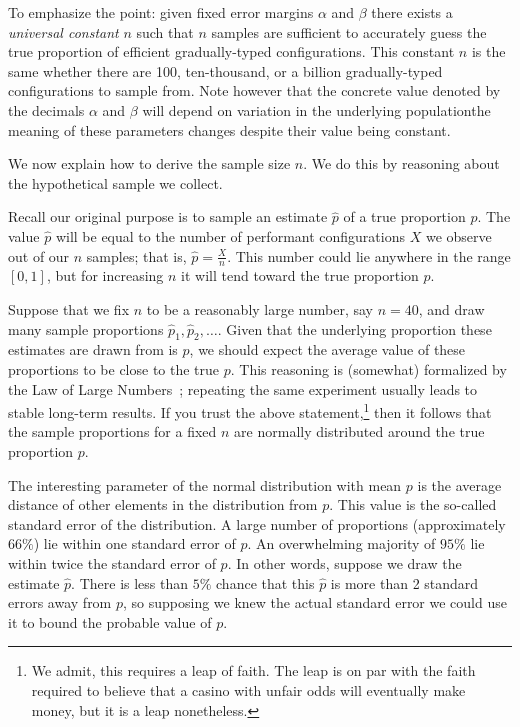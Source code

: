 \documentclass{article}
\begin{document}
To emphasize the point: given fixed error margins $\alpha$ and $\beta$ there exists a \emph{universal constant} $n$ such that $n$ samples are sufficient to accurately guess the true proportion of efficient gradually-typed configurations.
This constant $n$ is the same whether there are 100, ten-thousand, or a billion gradually-typed configurations to sample from.
Note however that the concrete value denoted by the decimals $\alpha$ and $\beta$ will depend on variation in the underlying population\textemdash the meaning of these parameters changes despite their value being constant.

We now explain how to derive the sample size $n$.
We do this by reasoning about the hypothetical sample we collect.

Recall our original purpose is to sample an estimate $\hat{p}$ of a true proportion $p$.
The value $\hat{p}$ will be equal to the number of performant configurations $X$ we observe out of our $n$ samples; that is, $\hat{p} = \frac{X}{n}$.
This number could lie anywhere in the range $[0, 1]$, but for increasing $n$ it will tend toward the true proportion $p$.

Suppose that we fix $n$ to be a reasonably large number, say $n=40$, and draw many sample proportions $\hat{p}_1, \hat{p}_2, \ldots$.
Given that the underlying proportion these estimates are drawn from is $p$, we should expect the average value of these proportions to be close to the true $p$.
This reasoning is (somewhat) formalized by the Law of Large Numbers~\cite{todo}; repeating the same experiment usually leads to stable long-term results.
If you trust the above statement,\footnote{We admit, this requires a leap of faith. The leap is on par with the faith required to believe that a casino with unfair odds will eventually make money, but it is a leap nonetheless.} then it follows that the sample proportions for a fixed $n$ are normally distributed around the true proportion $p$.

The interesting parameter of the normal distribution with mean $p$ is the average distance of other elements in the distribution from $p$.
This value is the so-called standard error of the distribution.
A large number of proportions (approximately $66\%$) lie within one standard error of $p$.
An overwhelming majority of $95\%$ lie within twice the standard error of $p$.
In other words, suppose we draw the estimate $\hat{p}$.
There is less than $5\%$ chance that this $\hat{p}$ is more than 2 standard errors away from $p$, so supposing we knew the actual standard error we could use it to bound the probable value of $p$.
\end{document}
